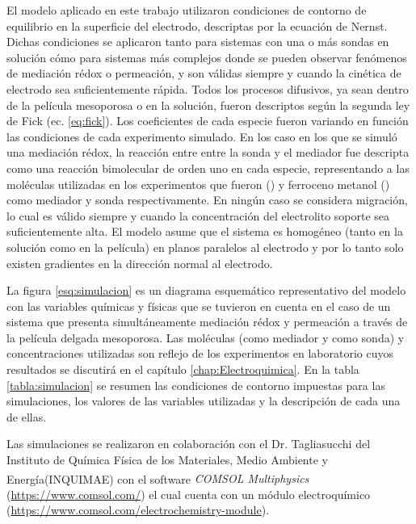 	 	 El modelo aplicado en este trabajo utilizaron condiciones de contorno de equilibrio en la superficie del electrodo, descriptas por la ecuación de Nernst. Dichas condiciones se aplicaron tanto para sistemas con una o más sondas en solución cómo para sistemas más complejos donde se pueden observar fenómenos de mediación rédox o permeación, y son válidas siempre y cuando la cinética de electrodo sea suficientemente rápida. Todos los procesos difusivos, ya sean dentro de la película mesoporosa o en la solución, fueron descriptos según la segunda ley de Fick (ec. \ref{eq:fick}). Los coeficientes de cada especie fueron variando en función las condiciones de cada experimento simulado. En los caso en los que se simuló una mediación rédox, la reacción entre entre la sonda y el mediador fue descripta como una reacción bimolecular de orden uno en cada especie, representando a las moléculas utilizadas en los experimentos que fueron \aminorutenio\space (\ru) y ferroceno metanol (\fc) como mediador y sonda respectivamente. En ningún caso se considera migración, lo cual es válido siempre y cuando la concentración del electrolito soporte sea suficientemente alta. El modelo asume que el sistema es homogéneo (tanto en la solución como en la película) en planos paralelos al electrodo y por lo tanto solo existen gradientes en la dirección normal al electrodo. 

	 	 La figura \ref{esq:simulacion} es un diagrama esquemático representativo del modelo con las variables químicas y físicas que se tuvieron en cuenta en el caso de un sistema que presenta simultáneamente mediación rédox y permeación a través de la película delgada mesoporosa. Las moléculas (\ru\space como mediador y \fc\space como sonda) y concentraciones utilizadas son reflejo de los experimentos en laboratorio cuyos resultados se discutirá en el capítulo \ref{chap:Electroquimica}.  En la tabla \ref{tabla:simulacion} se resumen las condiciones de contorno impuestas para las simulaciones, los valores de las variables utilizadas y la descripción de cada una de ellas.
		
	 	 Las simulaciones se realizaron en colaboración con el Dr. Tagliasucchi del Instituto de Química Física de los Materiales, Medio Ambiente y Energía\linebreak  (INQUIMAE) con el software \textit{COMSOL Multiphysics\textsuperscript\textregistered} (\url{https://www.comsol.com/}) el cual cuenta con un módulo electroquímico (\url{https://www.comsol.com/electrochemistry-module}).

